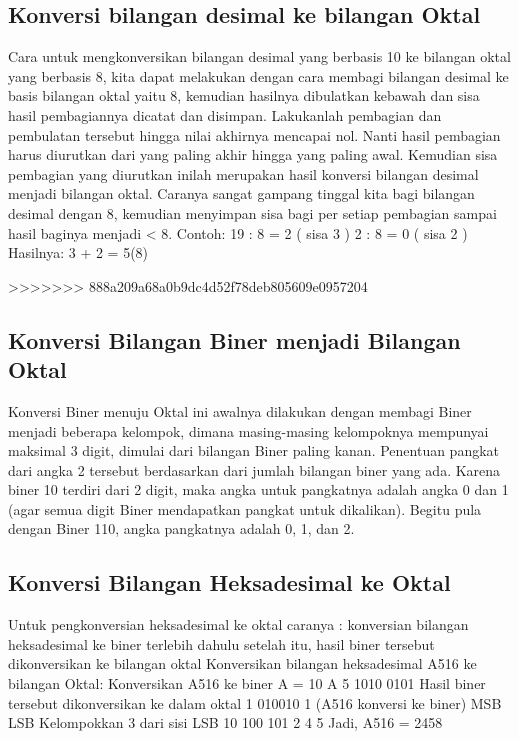 	\subsection {Konversi bilangan desimal ke bilangan Oktal}
	Cara untuk mengkonversikan bilangan desimal yang berbasis 10 ke bilangan oktal yang berbasis 8, kita dapat melakukan dengan cara  membagi bilangan desimal ke basis bilangan oktal yaitu 8, kemudian hasilnya dibulatkan kebawah dan sisa hasil pembagiannya dicatat dan disimpan. Lakukanlah pembagian dan pembulatan tersebut hingga nilai akhirnya mencapai nol. Nanti hasil pembagian harus diurutkan dari yang paling akhir hingga yang paling awal. Kemudian sisa pembagian yang diurutkan inilah merupakan hasil konversi bilangan desimal menjadi bilangan oktal.
	Caranya sangat gampang tinggal kita bagi bilangan desimal dengan 8, 
	kemudian menyimpan sisa bagi per setiap pembagian 
	sampai hasil baginya menjadi < 8.
	Contoh: 19 : 8 = 2 ( sisa 3 )
	2 : 8 = 0 ( sisa 2 )
	Hasilnya: 3 + 2 = 5(8)


>>>>>>> 888a209a68a0b9dc4d52f78deb805609e0957204
	\subsection {Konversi Bilangan Biner menjadi Bilangan Oktal}
	Konversi Biner menuju Oktal ini awalnya dilakukan dengan membagi Biner menjadi beberapa kelompok, dimana masing-masing kelompoknya mempunyai maksimal 3 digit, dimulai dari bilangan Biner paling kanan.
	Penentuan pangkat dari angka 2 tersebut berdasarkan dari jumlah bilangan biner yang ada. Karena biner 10 terdiri dari 2 digit, maka angka untuk pangkatnya adalah angka 0 dan 1 (agar semua digit Biner mendapatkan pangkat untuk dikalikan). Begitu pula dengan Biner 110, angka pangkatnya adalah 0, 1, dan 2.

	\subsection {Konversi Bilangan Heksadesimal ke Oktal}
	Untuk pengkonversian heksadesimal
	ke oktal caranya :
	konversian bilangan heksadesimal ke biner terlebih dahulu
	setelah itu, hasil biner tersebut dikonversikan ke bilangan oktal
	Konversikan bilangan heksadesimal
	A516 ke bilangan Oktal:
	Konversikan A516 ke biner
 	A = 10
  	A        5               
       1010   0101 
	Hasil biner tersebut dikonversikan ke dalam oktal
  	1   010010  1 (A516 konversi ke biner)
 	MSB           LSB
	Kelompokkan 3 dari sisi LSB
 	10    100   101
         2        4       5
	Jadi, A516  =  2458
